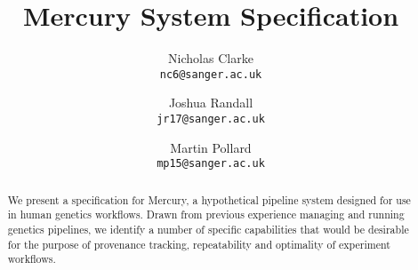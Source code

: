 \documentclass[10pt,a4paper]{article}
\author{
Nicholas Clarke \\ \texttt{nc6@sanger.ac.uk}
\and
Joshua Randall \\ \texttt{jr17@sanger.ac.uk}
\and
Martin Pollard \\ \texttt{mp15@sanger.ac.uk}
}
\title{Mercury System Specification}
\begin{document}

\maketitle

\begin{abstract}
We present a specification for Mercury, a hypothetical pipeline system designed for use in human genetics workflows. Drawn from previous experience managing and running genetics pipelines, we identify a number of specific capabilities that would be desirable for the purpose of provenance tracking, repeatability and optimality of experiment workflows.
\end{abstract}
\tableofcontents

\end{document}
